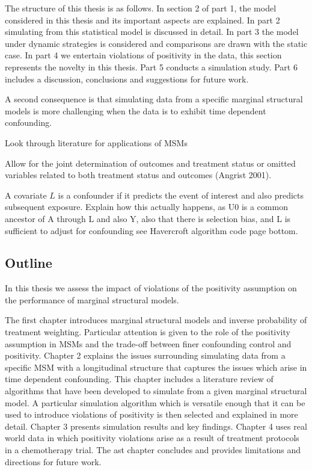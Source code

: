 \documentclass[11pt]{article}
\begin{document}
The structure of this thesis is as follows. In section 2 of part 1, the
model considered in this thesis and its important aspects are explained.
In part 2 simulating from this statistical model is discussed in detail.
In part 3 the model under dynamic strategies is considered and
comparisons are drawn with the static case. In part 4 we entertain
violations of positivity in the data, this section represents the
novelty in this thesis. Part 5 conducts a simulation study. Part 6
includes a discussion, conclusions and suggestions for future work.
\linebreak

A second consequence is that simulating data from a specific marginal
structural models is more challenging when the data is to exhibit time
dependent confounding.

Look through literature for applications of MSMs

    Allow for the joint determination of outcomes and treatment status or
omitted variables related to both treatment status and outcomes (Angrist
2001).

A covariate \(L\) is a confounder if it predicts the event of interest
and also predicts subsequent exposure. Explain how this actually
happens, as U0 is a common ancestor of A through L and also Y, also that
there is selection bias, and L is sufficient to adjust for confounding
see Havercroft algorithm code page bottom.

    \subsection{Outline}\label{outline}

In this thesis we assess the impact of violations of the positivity
assumption on the performance of marginal structural models. \linebreak

The first chapter introduces marginal structural models and inverse
probability of treatment weighting. Particular attention is given to the
role of the positivity assumption in MSMs and the trade-off between
finer confounding control and positivity. Chapter 2 explains the issues
surrounding simulating data from a specific MSM with a longitudinal
structure that captures the issues which arise in time dependent
confounding. This chapter includes a literature review of algorithms
that have been developed to simulate from a given marginal structural
model. A particular simulation algorithm which is versatile enough that
it can be used to introduce violations of positivity is then selected
and explained in more detail. Chapter 3 presents simulation results and
key findings. Chapter 4 uses real world data in which positivity
violations arise as a result of treatment protocols in a chemotherapy
trial. The ast chapter concludes and provides limitations and directions
for future work.
\end{document}
